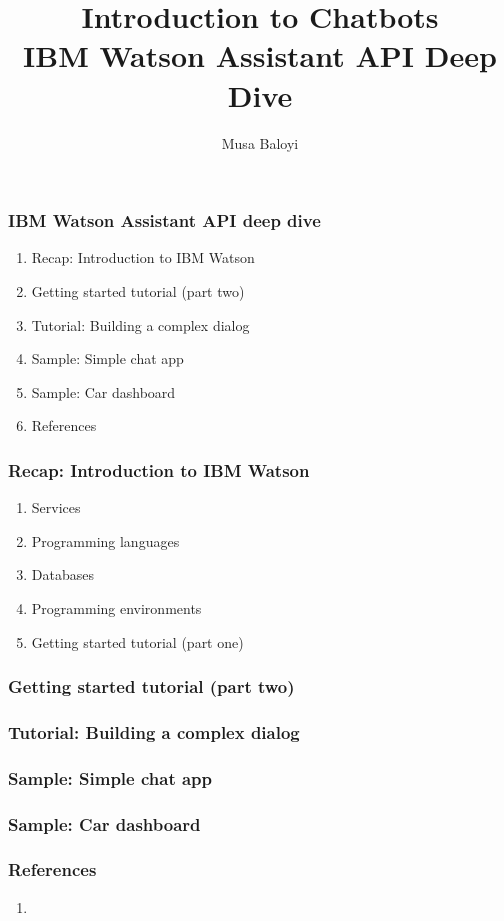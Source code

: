 \documentclass[11pt]{beamer}
\begin{document}
	\author{Musa Baloyi}
	\title{Introduction to Chatbots \\ IBM Watson Assistant API Deep Dive} %
	\begin{frame}[plain]
	\maketitle
\end{frame}

\begin{frame}
	\frametitle{IBM Watson Assistant API deep dive}
	\begin{enumerate}
		\item Recap: Introduction to IBM Watson
		\item Getting started tutorial (part two)
		\item Tutorial: Building a complex dialog
		\item Sample: Simple chat app
		\item Sample: Car dashboard
		\item References
	\end{enumerate}
\end{frame}

\begin{frame}
	\frametitle{Recap: Introduction to IBM Watson}
	\begin{enumerate}
		\item Services
		\item Programming languages
		\item Databases
		\item Programming environments
		\item Getting started tutorial (part one)
	\end{enumerate}
\end{frame}

\begin{frame}
	\frametitle{Getting started tutorial (part two)}
\end{frame}

\begin{frame}
	\frametitle{Tutorial: Building a complex dialog}
\end{frame}

\begin{frame}
	\frametitle{Sample: Simple chat app}
\end{frame}

\begin{frame}
	\frametitle{Sample: Car dashboard}
\end{frame}

\begin{frame}
\frametitle{References}
\begin{enumerate}
	\item 
\end{enumerate}
\end{frame}
\end{document}
